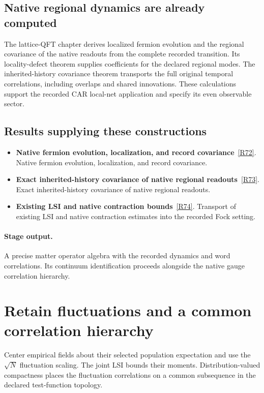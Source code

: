 \documentclass[11pt,a4paper]{article}
\begin{document}
\subsection*{Native regional dynamics are already computed}
The lattice-QFT chapter derives localized fermion evolution and the regional covariance of the native readouts from the complete recorded transition. Its locality-defect theorem supplies coefficients for the declared regional modes. The inherited-history covariance theorem transports the full original temporal correlations, including overlaps and shared innovations. These calculations support the recorded CAR local-net application and specify its even observable sector.
\subsection*{Results supplying these constructions}
\begin{itemize}
\item \textbf{Native fermion evolution, localization, and record covariance}~\hyperref[src:thm-lqft-native-local-fermion-evolution]{[R72]}. Native fermion evolution, localization, and record covariance.
\item \textbf{Exact inherited-history covariance of native regional readouts}~\hyperref[src:thm-lqft-inherited-history-covariance]{[R73]}. Exact inherited-history covariance of native regional readouts.
\item \textbf{Existing LSI and native contraction bounds}~\hyperref[src:cor-lqft-fock-lsi-transfer]{[R74]}. Transport of existing LSI and native contraction estimates into the recorded Fock setting.
\end{itemize}
\paragraph{Stage output.} A precise matter operator algebra with the recorded dynamics and word correlations. Its continuum identification proceeds alongside the native gauge correlation hierarchy.

\section{Retain fluctuations and a common correlation hierarchy}
\label{stage:14}
Center empirical fields about their selected population expectation and use the \(\sqrt N\) fluctuation scaling. The joint LSI bounds their moments. Distribution-valued compactness places the fluctuation correlations on a common subsequence in the declared test-function topology.
\end{document}
